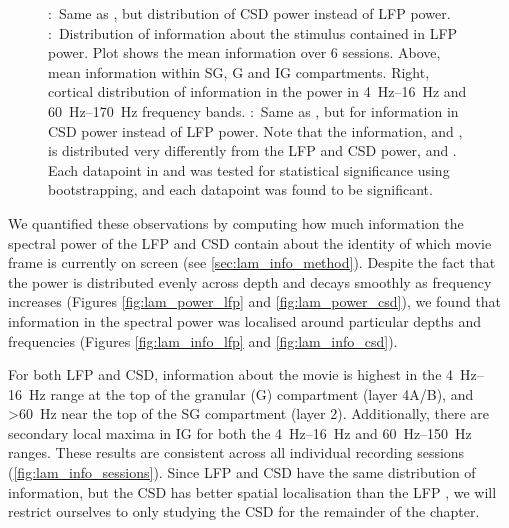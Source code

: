 \begin{figure}[htbp]
{\protect{}:~Same as \protect{}, but distribution of \ac{CSD} power instead of \ac{LFP} power.
\protect{}:~Distribution of information about the stimulus contained in \ac{LFP} power.
Plot shows the mean information over \num{6} sessions.
Above, mean information within \ac{SG}, \ac{G} and \ac{IG} compartments.
Right, cortical distribution of information in the power in \SIrange{4}{16}{Hz} and \SIrange{60}{170}{Hz} frequency bands.
\protect{}:~Same as \protect{}, but for information in \ac{CSD} power instead of \ac{LFP} power.
Note that the information, \protect{} and \protect{}, is distributed very differently from the \ac{LFP} and \ac{CSD} power, \protect{} and \protect{}.
Each datapoint in \protect{} and \protect{} was tested for statistical significance using bootstrapping, and each datapoint was found to be significant.
    \label{fig:lam_info}
}
\end{figure}

We quantified these observations by computing how much information the spectral power of the \ac{LFP} and \ac{CSD} contain about the identity of which movie frame is currently on screen (see \autoref{sec:lam_info_method}).
Despite the fact that the power is distributed evenly across depth and decays smoothly as frequency increases (Figures \ref{fig:lam_power_lfp} and \ref{fig:lam_power_csd}), we found that information in the spectral power was localised around particular depths and frequencies (Figures \ref{fig:lam_info_lfp} and \ref{fig:lam_info_csd}).

For both \ac{LFP} and \ac{CSD}, information about the movie is highest in the \SIrange{4}{16}{Hz} range at the top of the granular (\acs{G}) compartment (layer 4A/B), and \SI{>60}{Hz} near the top of the \ac{SG} compartment (layer 2).
Additionally, there are secondary local maxima in \ac{IG} for both the \SIrange{4}{16}{Hz} and \SIrange{60}{150}{Hz} ranges.
These results are consistent across all individual recording sessions (\autoref{fig:lam_info_sessions}).
Since \ac{LFP} and \ac{CSD} have the same distribution of information, but the \ac{CSD} has better spatial localisation than the \ac{LFP} \citep{Einevoll2013,Kajikawa2011}, we will restrict ourselves to only studying the \ac{CSD} for the remainder of the chapter.

